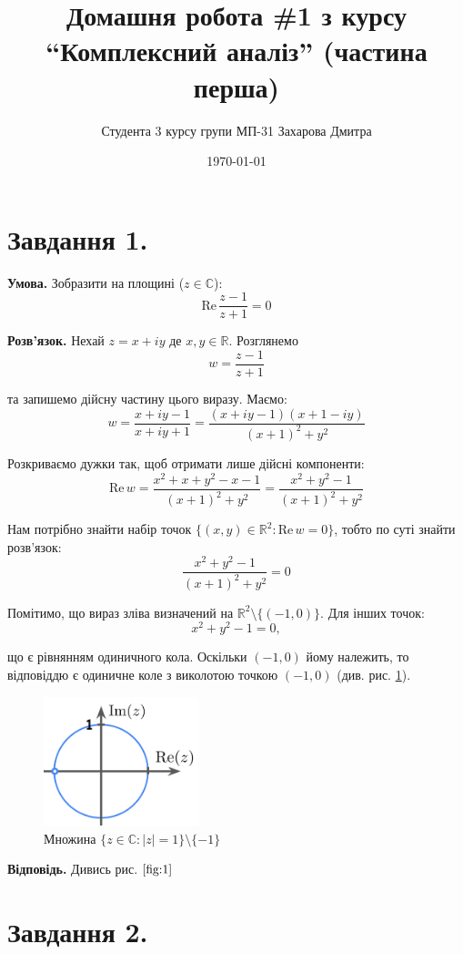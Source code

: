 \documentclass[12pt]{extarticle}
\title{Домашня робота \#1 з курсу ``Комплексний аналіз'' (частина перша)}
\author{Студента 3 курсу групи МП-31 Захарова Дмитра}
\date{\today}
\begin{document}
\maketitle

\section*{Завдання 1.} 

\textbf{Умова.} Зобразити на площині ($z \in \mathbb{C}$):
\[
\text{Re}\, \frac{z-1}{z+1} = 0
\]

\textbf{Розв'язок.} Нехай $z = x+i y$ де $x,y \in \mathbb{R}$. Розглянемо
\[
w = \frac{z-1}{z+1}
\]

та запишемо дійсну частину цього виразу. Маємо:
\[
w = \frac{x + iy - 1}{x + iy + 1} = \frac{(x+iy-1)(x+1-iy)}{(x+1)^2 + y^2}
\]

Розкриваємо дужки так, щоб отримати лише дійсні компоненти:
\[
\text{Re} \, w = \frac{x^2+x+y^2-x-1}{(x+1)^2+y^2} = \frac{x^2+y^2-1}{(x+1)^2+y^2}
\]

Нам потрібно знайти набір точок $\{(x,y) \in \mathbb{R}^2: \text{Re} \, w = 0\}$, тобто по суті знайти розв'язок:
\[
\frac{x^2+y^2-1}{(x+1)^2+y^2} = 0
\]

Помітимо, що вираз зліва визначений на $\mathbb{R}^2 \setminus \{(-1,0)\}$. Для інших точок:
\[
x^2+y^2-1 = 0,
\]

що є рівнянням одиничного кола. Оскільки $(-1,0)$ йому належить, то відповіддю є одиничне коле з виколотою точкою $(-1,0)$ (див. рис. \ref{fig:1}).

\begin{figure}[H]
    \centering
    \includegraphics[width=0.4\textwidth]{images/hw_1/hw_1_1.png}
    \caption{Множина $\{z \in \mathbb{C}: |z|=1\} \setminus \{-1\}$}
    \label{fig:1}
\end{figure}
\vspace{5px}

\textbf{Відповідь.} Дивись рис. $\ref{fig:1}$

\section*{Завдання 2.} 
\end{document}

